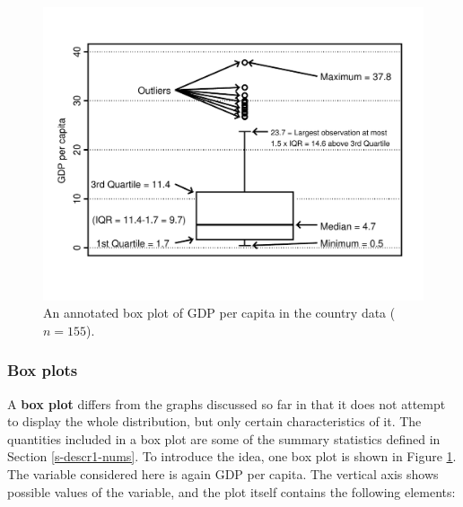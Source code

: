 \documentclass[11pt,a4paper,openany]{book}
\begin{document}
\begin{figure}[htbp]
\centering
\includegraphics[width=15.00000cm]{box_gdp.pdf}
\caption{\label{fig:f-boxplot-gdp} An annotated box plot of GDP per capita
in the country data (\(n=155\)).}
\end{figure}

\subsubsection*{Box plots}\label{box-plots}

A \textbf{box plot} differs from the graphs discussed so far in that it
does not attempt to display the whole distribution, but only certain
characteristics of it. The quantities included in a box plot are some of
the summary statistics defined in Section \ref{s-descr1-nums}. To
introduce the idea, one box plot is shown in Figure
\ref{fig:f-boxplot-gdp}. The variable considered here is again GDP per
capita. The vertical axis shows possible values of the variable, and the
plot itself contains the following elements:
\end{document}
